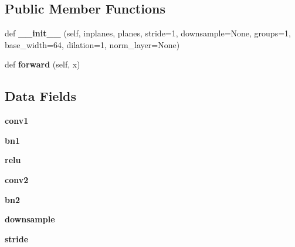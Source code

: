 \subsection*{Public Member Functions}
\begin{DoxyCompactItemize}
\item 
\mbox{\label{classtorchvision_1_1models_1_1resnet_1_1BasicBlock_a19b9990ff0708e9376c1658fc59262d9}} 
def {\bfseries \+\_\+\+\_\+init\+\_\+\+\_\+} (self, inplanes, planes, stride=1, downsample=None, groups=1, base\+\_\+width=64, dilation=1, norm\+\_\+layer=None)
\item 
\mbox{\label{classtorchvision_1_1models_1_1resnet_1_1BasicBlock_a535ad6f9a377ab5d4a0b675b15c4eb70}} 
def {\bfseries forward} (self, x)
\end{DoxyCompactItemize}
\subsection*{Data Fields}
\begin{DoxyCompactItemize}
\item 
\mbox{\label{classtorchvision_1_1models_1_1resnet_1_1BasicBlock_a3ffc18976e7b76dd0ebd121d6b40ccb2}} 
{\bfseries conv1}
\item 
\mbox{\label{classtorchvision_1_1models_1_1resnet_1_1BasicBlock_a11e066d7ce11f945652fc89ba8f2cf44}} 
{\bfseries bn1}
\item 
\mbox{\label{classtorchvision_1_1models_1_1resnet_1_1BasicBlock_a24ce2f557178f1ab11bcea50fa0bc714}} 
{\bfseries relu}
\item 
\mbox{\label{classtorchvision_1_1models_1_1resnet_1_1BasicBlock_afbdfa6848564c8f5064b93e6cf51301c}} 
{\bfseries conv2}
\item 
\mbox{\label{classtorchvision_1_1models_1_1resnet_1_1BasicBlock_a47e012bbae314c9e2724dc798abb0ad7}} 
{\bfseries bn2}
\item 
\mbox{\label{classtorchvision_1_1models_1_1resnet_1_1BasicBlock_a5ec26277d613fabd295546e0805facbb}} 
{\bfseries downsample}
\item 
\mbox{\label{classtorchvision_1_1models_1_1resnet_1_1BasicBlock_aac05bcf5d7b49524a969d92f3c2f12f2}} 
{\bfseries stride}
\end{DoxyCompactItemize}
